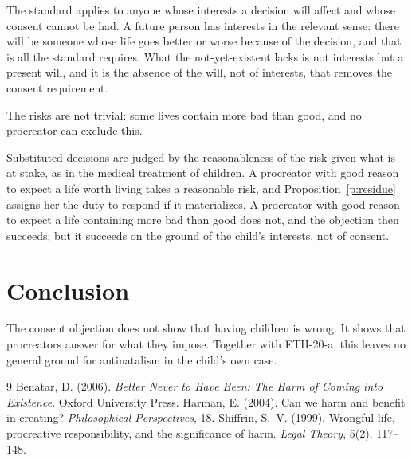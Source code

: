 \documentclass{situationist-preprint}
\begin{document}
\begin{reply}
The standard applies to anyone whose interests a decision will affect and whose consent cannot be had. A future person has interests in the relevant sense: there will be someone whose life goes better or worse because of the decision, and that is all the standard requires. What the not-yet-existent lacks is not interests but a present will, and it is the absence of the will, not of interests, that removes the consent requirement.
\end{reply}

\begin{objection}
The risks are not trivial: some lives contain more bad than good, and no procreator can exclude this.
\end{objection}

\begin{reply}
Substituted decisions are judged by the reasonableness of the risk given what is at stake, as in the medical treatment of children. A procreator with good reason to expect a life worth living takes a reasonable risk, and Proposition~\ref{p:residue} assigns her the duty to respond if it materializes. A procreator with good reason to expect a life containing more bad than good does not, and the objection then succeeds; but it succeeds on the ground of the child's interests, not of consent.
\end{reply}

\section{Conclusion}

The consent objection does not show that having children is wrong. It shows that procreators answer for what they impose. Together with ETH-20-a, this leaves no general ground for antinatalism in the child's own case.

\begin{thebibliography}{9}\small
{} Benatar, D. (2006). \emph{Better Never to Have Been: The Harm of Coming into Existence}. Oxford University Press.
 Harman, E. (2004). Can we harm and benefit in creating? \emph{Philosophical Perspectives}, 18.
 Shiffrin, S.~V. (1999). Wrongful life, procreative responsibility, and the significance of harm. \emph{Legal Theory}, 5(2), 117--148.
\end{thebibliography}
\end{document}
